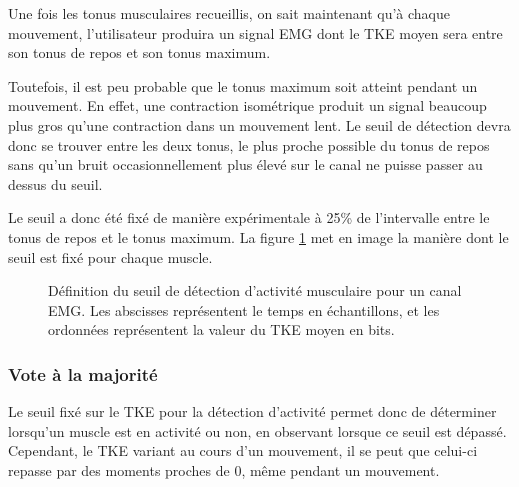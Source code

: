 \documentclass[letterpaper, twoside, 12pt, memoire, creativecommons, hyperref]{thETS}
\begin{document}
Une fois les tonus musculaires recueillis, on sait maintenant qu'à chaque mouvement, l'utilisateur produira un signal EMG dont le TKE moyen sera entre son tonus de repos et son tonus maximum. 

Toutefois, il est peu probable que le tonus maximum soit atteint pendant un mouvement. En effet, une contraction isométrique produit un signal beaucoup plus gros qu'une contraction dans un mouvement lent. Le seuil de détection devra donc se trouver entre les deux tonus, le plus proche possible du tonus de repos sans qu'un bruit occasionnellement plus élevé sur le canal ne puisse passer au dessus du seuil. 

Le seuil a donc été fixé de manière expérimentale à 25\% de l'intervalle entre le tonus de repos et le tonus maximum. La figure \ref{fig:seuilDetection} met en image la manière dont le seuil est fixé pour chaque muscle.

\begin{figure}
	\centering
	\caption{Définition du seuil de détection d'activité musculaire pour un canal EMG. Les abscisses représentent le temps en échantillons, et les ordonnées représentent la valeur du TKE moyen en bits.}
	\label{fig:seuilDetection}
\end{figure}

\subsubsection{Vote à la majorité}
\label{CHvote}
Le seuil fixé sur le TKE pour la détection d'activité permet donc de déterminer lorsqu'un muscle est en activité ou non, en observant lorsque ce seuil est dépassé. Cependant, le TKE variant au cours d'un mouvement, il se peut que celui-ci repasse par des moments proches de 0, même pendant un mouvement.
\end{document}
